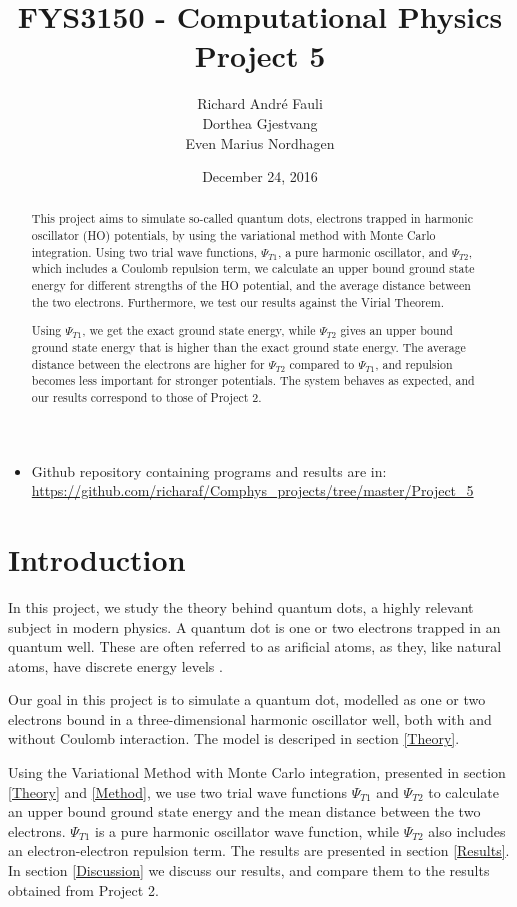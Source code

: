 \documentclass[norsk,a4paper,12pt]{article}
\title{FYS3150 - Computational Physics\\\vspace{2mm} \Large{Project 5}}
\author{\large Richard Andr\'e Fauli\\ Dorthea Gjestvang\\ Even Marius Nordhagen}
\date{December 24, 2016}
\begin{document}
\maketitle
\begin{abstract}
This project aims to simulate so-called quantum dots, electrons trapped in harmonic oscillator (HO) potentials, by using the variational method with Monte Carlo integration. Using two trial wave functions, $\Psi_{T1}$, a pure harmonic oscillator, and $\Psi_{T2}$, which includes a Coulomb repulsion term, we calculate an upper bound ground state energy for different strengths of the HO potential, and the average distance between the two electrons. Furthermore, we test our results against the Virial Theorem.\par

Using $\Psi_{T1}$, we get the exact ground state energy, while $\Psi_{T2}$ gives an upper bound ground state energy that is higher than the exact ground state energy. The average distance between the electrons are higher for $\Psi_{T2}$ compared to $\Psi_{T1}$, and repulsion becomes less important for stronger potentials. The system behaves as expected, and our results correspond to those of Project 2.
\par 

\end{abstract}


\begin{itemize}
\item Github repository containing programs and results are in: \url{https://github.com/richaraf/Comphys_projects/tree/master/Project_5}
\end{itemize}


\section{Introduction}
In this project, we study the theory behind quantum dots, a highly relevant subject in modern physics. A quantum dot is one or two electrons trapped in an quantum well. These are often referred to as arificial atoms, as they, like natural atoms, have discrete energy levels \cite{Nature}.

Our goal in this project is to simulate a quantum dot, modelled as one or two electrons bound in a three-dimensional harmonic oscillator well, both with and without Coulomb interaction. The model is descriped in section \ref{Theory}. \par

Using the Variational Method with Monte Carlo integration, presented in section \ref{Theory} and \ref{Method}, we use two trial wave functions $\Psi_{T1}$ and $\Psi_{T2}$ to calculate an upper bound ground state energy and the mean distance between the two electrons. $\Psi_{T1}$ is a pure harmonic oscillator wave function, while $\Psi_{T2}$ also includes an electron-electron repulsion term. The results are presented in section \ref{Results}. In section \ref{Discussion} we discuss our results, and compare them to the results obtained from Project 2.
\end{document}
